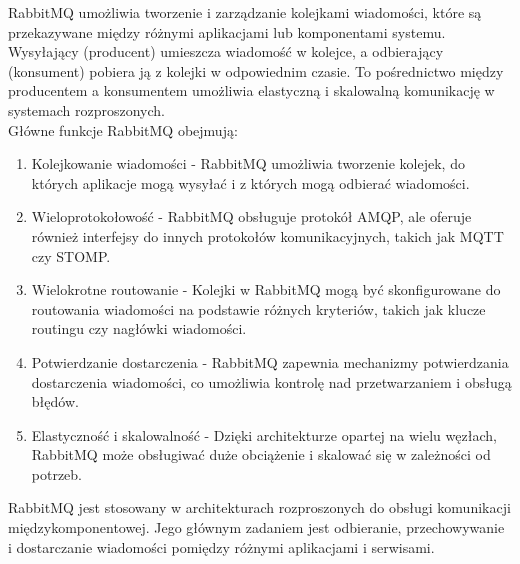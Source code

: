 \documentclass[12pt,twoside]{article}
\begin{document}
RabbitMQ umożliwia tworzenie i zarządzanie kolejkami wiadomości, które są przekazywane między różnymi aplikacjami lub komponentami systemu. Wysyłający (producent) umieszcza wiadomość w kolejce, a odbierający (konsument) pobiera ją z kolejki w odpowiednim czasie. To pośrednictwo między producentem a konsumentem umożliwia elastyczną i skalowalną komunikację w systemach rozproszonych.\\

Główne funkcje RabbitMQ obejmują:
\begin{enumerate}[label=\alph*), leftmargin=1.25cm]
	\item Kolejkowanie wiadomości - RabbitMQ umożliwia tworzenie kolejek, do których aplikacje mogą wysyłać i z których mogą odbierać wiadomości.
	\item Wieloprotokołowość - RabbitMQ obsługuje protokół AMQP, ale oferuje również interfejsy do innych protokołów komunikacyjnych, takich jak MQTT czy STOMP.
	\item Wielokrotne routowanie - Kolejki w RabbitMQ mogą być skonfigurowane do routowania wiadomości na podstawie różnych kryteriów, takich jak klucze routingu czy nagłówki wiadomości.
	\item Potwierdzanie dostarczenia - RabbitMQ zapewnia mechanizmy potwierdzania dostarczenia wiadomości, co umożliwia kontrolę nad przetwarzaniem i obsługą błędów.
	\item Elastyczność i skalowalność - Dzięki architekturze opartej na wielu węzłach, RabbitMQ może obsługiwać duże obciążenie i skalować się w zależności od potrzeb.
\end{enumerate}
RabbitMQ jest stosowany w architekturach rozproszonych do obsługi komunikacji międzykomponentowej. Jego głównym zadaniem jest odbieranie, przechowywanie i dostarczanie wiadomości pomiędzy różnymi aplikacjami i serwisami.\\
\end{document}
